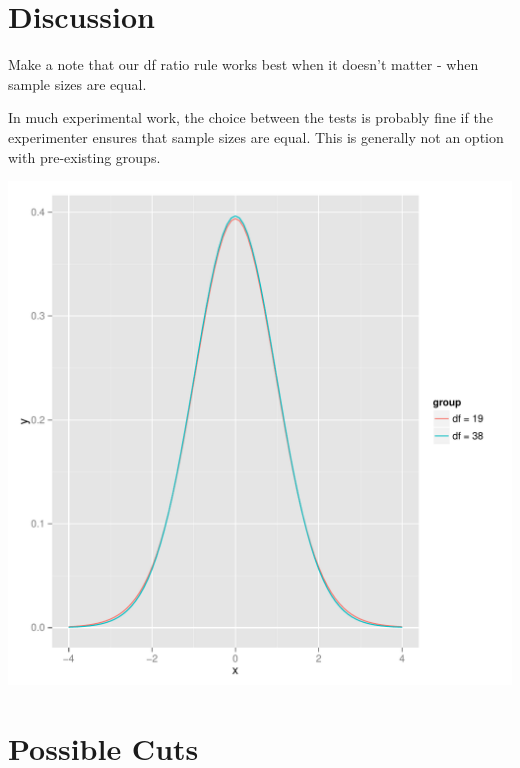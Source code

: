 \documentclass[man,a4paper,noextraspace,apacite]{apa6}\usepackage[]{graphicx}\usepackage[]{color}
\makeatletter
\def\maxwidth{ %
  \ifdim\Gin@nat@width>\linewidth
    \linewidth
  \else
    \Gin@nat@width
  \fi
}
\newenvironment{knitrout}{}{} %
\makeatother
\begin{document}
\section{Discussion}
    Make a note that our df ratio rule works best when it doesn't matter - when sample sizes are equal.
    
    In much experimental work, the choice between the tests is probably fine if the experimenter ensures that sample sizes are equal. This is generally not an option with pre-existing groups. 

\begin{knitrout}
\color{fgcolor}
\includegraphics[width=\maxwidth]{figure/tdist} 

\end{knitrout}


\section{Possible Cuts}
\end{document}
